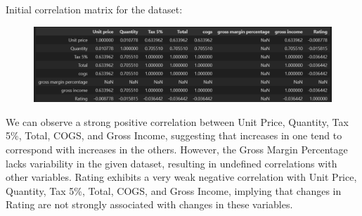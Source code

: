 
 
 

\newpage
{Initial correlation matrix for the dataset:}

\begin{figure}[h]
    \centering
    \includegraphics[width=1\textwidth]{Chapters/ch1/ch_1_corr_matrix.png}
\end{figure}

We can observe a strong positive correlation between Unit Price, Quantity, Tax 5\%, Total, COGS, and Gross Income, suggesting that increases in one tend to correspond with increases in the others. However, the Gross Margin Percentage lacks variability in the given dataset, resulting in undefined correlations with other variables. Rating exhibits a very weak negative correlation with Unit Price, Quantity, Tax 5\%, Total, COGS, and Gross Income, implying that changes in Rating are not strongly associated with changes in these variables.



